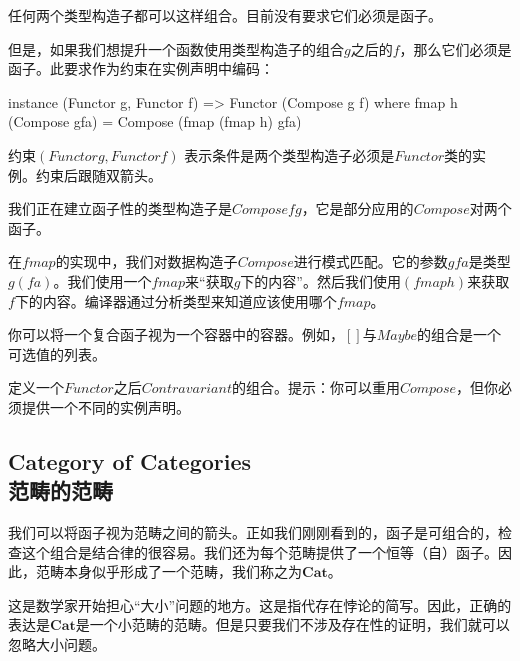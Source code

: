 \documentclass[DaoFP]{subfiles}
\begin{document}
    任何两个类型构造子都可以这样组合。目前没有要求它们必须是函子。

    但是，如果我们想提升一个函数使用类型构造子的组合$g$之后的$f$，那么它们必须是函子。此要求作为约束在实例声明中编码：

    \begin{haskell}
        instance (Functor g, Functor f) => Functor (Compose g f) where
        fmap h (Compose gfa) = Compose (fmap (fmap h) gfa)
    \end{haskell}

    约束$ (Functor g, Functor f) $ 表示条件是两个类型构造子必须是$Functor$类的实例。约束后跟随双箭头。

    我们正在建立函子性的类型构造子是$Compose f g$，它是部分应用的$Compose$对两个函子。

    在$fmap$的实现中，我们对数据构造子$Compose$进行模式匹配。它的参数$gfa$是类型$g (f a)$。我们使用一个$fmap$来“获取$g$下的内容”。然后我们使用$ (fmap h) $来获取$f$下的内容。编译器通过分析类型来知道应该使用哪个$fmap$。

    你可以将一个复合函子视为一个容器中的容器。例如，$ [] $与$Maybe$的组合是一个可选值的列表。

    \begin{exercise}
        定义一个$Functor$之后$Contravariant$的组合。提示：你可以重用$Compose$，但你必须提供一个不同的实例声明。
    \end{exercise}

    \subsection{Category of Categories\\范畴的范畴}

    我们可以将函子视为范畴之间的箭头。正如我们刚刚看到的，函子是可组合的，检查这个组合是结合律的很容易。我们还为每个范畴提供了一个恒等（自）函子。因此，范畴本身似乎形成了一个范畴，我们称之为$\mathbf{Cat}$。

    这是数学家开始担心“大小”问题的地方。这是指代存在悖论的简写。因此，正确的表达是$\mathbf{Cat}$是一个小范畴的范畴。但是只要我们不涉及存在性的证明，我们就可以忽略大小问题。
\end{document}
